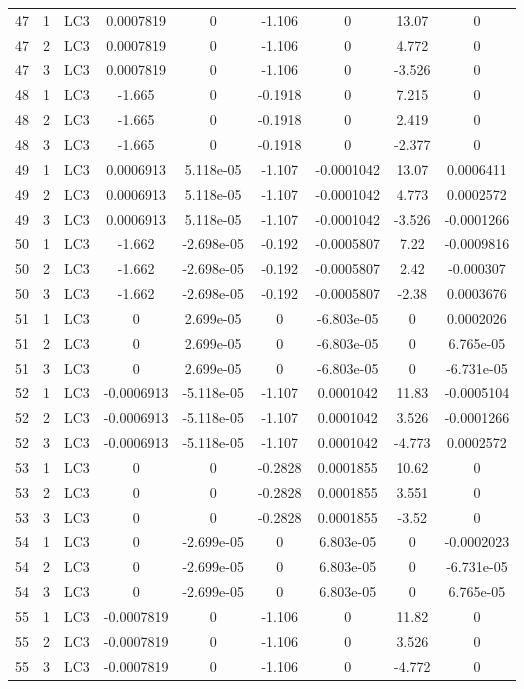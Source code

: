 \documentclass{article}%
\begin{document}
\begin{longtable}{| c c c | c c c c c c |}
47&1&LC3&0.0007819&0&{-}1.106&0&13.07&0\\%
47&2&LC3&0.0007819&0&{-}1.106&0&4.772&0\\%
47&3&LC3&0.0007819&0&{-}1.106&0&{-}3.526&0\\%
48&1&LC3&{-}1.665&0&{-}0.1918&0&7.215&0\\%
48&2&LC3&{-}1.665&0&{-}0.1918&0&2.419&0\\%
48&3&LC3&{-}1.665&0&{-}0.1918&0&{-}2.377&0\\%
49&1&LC3&0.0006913&5.118e{-}05&{-}1.107&{-}0.0001042&13.07&0.0006411\\%
49&2&LC3&0.0006913&5.118e{-}05&{-}1.107&{-}0.0001042&4.773&0.0002572\\%
49&3&LC3&0.0006913&5.118e{-}05&{-}1.107&{-}0.0001042&{-}3.526&{-}0.0001266\\%
50&1&LC3&{-}1.662&{-}2.698e{-}05&{-}0.192&{-}0.0005807&7.22&{-}0.0009816\\%
50&2&LC3&{-}1.662&{-}2.698e{-}05&{-}0.192&{-}0.0005807&2.42&{-}0.000307\\%
50&3&LC3&{-}1.662&{-}2.698e{-}05&{-}0.192&{-}0.0005807&{-}2.38&0.0003676\\%
51&1&LC3&0&2.699e{-}05&0&{-}6.803e{-}05&0&0.0002026\\%
51&2&LC3&0&2.699e{-}05&0&{-}6.803e{-}05&0&6.765e{-}05\\%
51&3&LC3&0&2.699e{-}05&0&{-}6.803e{-}05&0&{-}6.731e{-}05\\%
52&1&LC3&{-}0.0006913&{-}5.118e{-}05&{-}1.107&0.0001042&11.83&{-}0.0005104\\%
52&2&LC3&{-}0.0006913&{-}5.118e{-}05&{-}1.107&0.0001042&3.526&{-}0.0001266\\%
52&3&LC3&{-}0.0006913&{-}5.118e{-}05&{-}1.107&0.0001042&{-}4.773&0.0002572\\%
53&1&LC3&0&0&{-}0.2828&0.0001855&10.62&0\\%
53&2&LC3&0&0&{-}0.2828&0.0001855&3.551&0\\%
53&3&LC3&0&0&{-}0.2828&0.0001855&{-}3.52&0\\%
54&1&LC3&0&{-}2.699e{-}05&0&6.803e{-}05&0&{-}0.0002023\\%
54&2&LC3&0&{-}2.699e{-}05&0&6.803e{-}05&0&{-}6.731e{-}05\\%
54&3&LC3&0&{-}2.699e{-}05&0&6.803e{-}05&0&6.765e{-}05\\%
55&1&LC3&{-}0.0007819&0&{-}1.106&0&11.82&0\\%
55&2&LC3&{-}0.0007819&0&{-}1.106&0&3.526&0\\%
55&3&LC3&{-}0.0007819&0&{-}1.106&0&{-}4.772&0\\%

\end{longtable}
\end{document}
